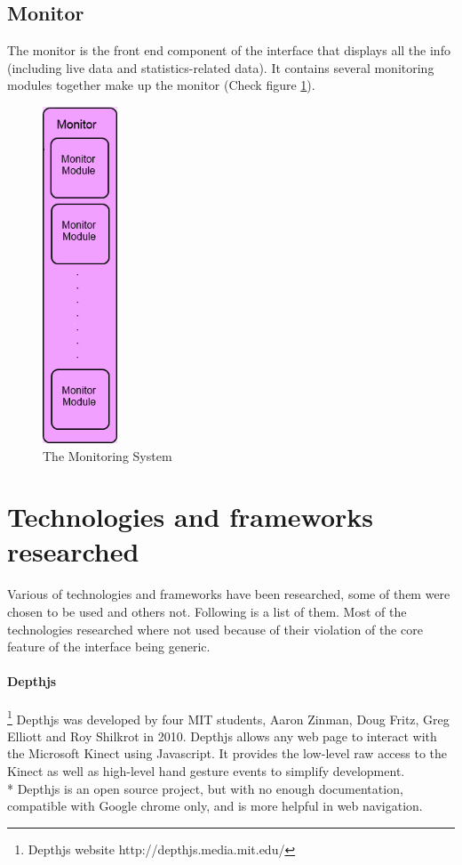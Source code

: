 \subsection{Monitor}
The monitor is the front end component of the interface that displays all the info (including live data and statistics-related data). It contains several monitoring modules together make up the monitor (Check figure \ref{fig:monitor}).

\begin{figure}[htbp]
\centering 
\includegraphics[height=100mm]{Monitor.png}
\caption{The Monitoring System}
\label{fig:monitor} 
\end{figure}

\section{Technologies and frameworks researched}
Various of technologies and frameworks have been researched, some of them were chosen to be used and others not. Following is a list of them.
Most of the technologies researched where not used because of their violation of the core feature of the interface being generic.

\paragraph{Depthjs}\footnote{Depthjs website http://depthjs.media.mit.edu/}
Depthjs was developed by four MIT students, Aaron Zinman, Doug Fritz, Greg Elliott and Roy Shilkrot in 2010. Depthjs allows any web page to interact with the Microsoft Kinect using Javascript. It provides the low-level raw access to the Kinect as well as high-level hand gesture events to simplify development.
\\* Depthjs is an open source project, but with no enough documentation, compatible with Google chrome only, and is more helpful in web navigation.

